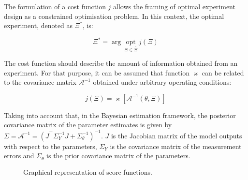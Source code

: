 \documentclass[a4paper,fleqn]{cas-dc}
\begin{document}
		The formulation of a cost function $j$ allows the framing of optimal experiment design as a constrained optimisation problem. In this context, the optimal experiment, denoted as $\Xi^*$, is:
		
		{\footnotesize \begin{equation} \Xi^* = \arg~\underset{\Xi \in \bar{\Xi}}{\text{opt}}~j\left(\Xi\right) \end{equation} }
		
		The cost function should describe the amount of information obtained from an experiment. For that purpose, it can be assumed that function $\varkappa$ can be related to the covariance matrix $\mathcal{A}^{-1}$ obtained under arbitrary operating conditions:
		
		{\footnotesize \begin{equation} j(\Xi) = \varkappa\left[ \mathcal{A}^{-1}(\theta, \Xi) \right] \end{equation} }
		
		Taking into account that, in the Bayesian estimation framework, the posterior covariance matrix of the parameter estimates is given by $\Sigma = \mathcal{A}^{-1} = \left(J^\top \Sigma_Y^{-1} J + \Sigma_\theta^{-1}\right)^{-1} $. $J$ is the Jacobian matrix of the model outputs with respect to the parameters, $\Sigma_Y$ is the covariance matrix of the measurement errors and $\Sigma_\theta$ is the prior covariance matrix of the parameters.
		
		\begin{figure}[!h]
			\centering
			\caption{Graphical representation of score functions.}
			\label{fig:score_fun}
		\end{figure}
		
\end{document}

